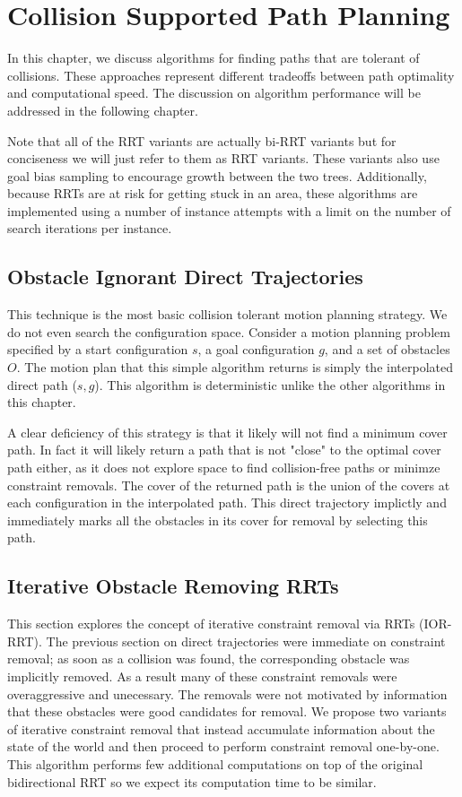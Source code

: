 \chapter{Collision Supported Path Planning} \label{chap:algos}
In this chapter, we discuss algorithms for finding paths that are tolerant of collisions. These approaches represent different tradeoffs between path optimality and computational speed. The discussion on algorithm performance will be addressed in the following chapter.

Note that all of the RRT variants are actually bi-RRT variants but for conciseness we will just refer to them as RRT variants. These variants also use goal bias sampling to encourage growth between the two trees. Additionally, because RRTs are at risk for getting stuck in an area, these algorithms are implemented using a number of instance attempts with a limit on the number of search iterations per instance. 

\section{Obstacle Ignorant Direct Trajectories}
This technique is the most basic collision tolerant motion planning strategy. We do not even search the configuration space. Consider a motion planning problem specified by a start configuration $s$, a goal configuration $g$, and a set of obstacles $O$. The motion plan that this simple algorithm returns is simply the interpolated direct path ($s, g$). This algorithm is deterministic unlike the other algorithms in this chapter. 

A clear deficiency of this strategy is that it likely will not find a minimum cover path. In fact it will likely return a path that is not "close" to the optimal cover path either, as it does not explore space to find collision-free paths or minimze constraint removals. The cover of the returned path is the union of the covers at each configuration in the interpolated path. This direct trajectory implictly and immediately marks all the obstacles in its cover for removal by selecting this path.

\section{Iterative Obstacle Removing RRTs}
This section explores the concept of iterative constraint removal via RRTs (IOR-RRT). The previous section on direct trajectories were immediate on constraint removal; as soon as a collision was found, the corresponding obstacle was implicitly removed. As a result many of these constraint removals were overaggressive and unecessary. The removals were not motivated by information that these obstacles were good candidates for removal. We propose two variants of iterative constraint removal that instead accumulate information about the state of the world and then proceed to perform constraint removal one-by-one. This algorithm performs few additional computations on top of the original bidirectional RRT so we expect its computation time to be similar.

